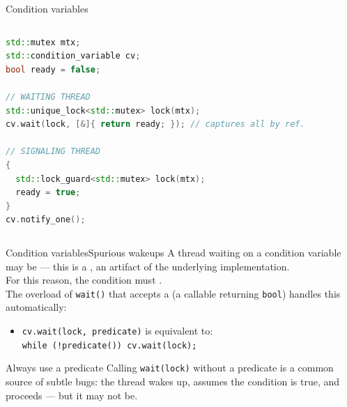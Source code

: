 \begin{frame}[fragile]{Condition variables}
	\begin{columns}
		\begin{lstlisting}[style=codebeamer, language=C++, caption=Basic condition variable pattern.]
std::mutex mtx;
std::condition_variable cv;
bool ready = false;

// WAITING THREAD
std::unique_lock<std::mutex> lock(mtx);
cv.wait(lock, [&]{ return ready; }); // captures all by ref.

// SIGNALING THREAD
{
  std::lock_guard<std::mutex> lock(mtx);
  ready = true;
}
cv.notify_one();
    \end{lstlisting}
	\end{columns}
\end{frame}
\begin{frame}{Condition variables}{Spurious wakeups}
	\justifying
	A thread waiting on a condition variable may be  — this is a , an artifact of the underlying implementation.\\
	\bigskip
	For this reason, the condition must .\\
	The overload of \texttt{wait()} that accepts a  (a callable returning \texttt{bool}) handles this automatically:
	\begin{itemize}
		\item \texttt{cv.wait(lock, predicate)} is equivalent to:\\
			\texttt{while (!predicate()) cv.wait(lock);}
	\end{itemize}
	\bigskip
	\begin{alertblock}{Always use a predicate}
		\justifying
		Calling \texttt{wait(lock)} without a predicate is a common source of subtle bugs: the thread wakes up, assumes the condition is true, and proceeds — but it may not be.
	\end{alertblock}
\end{frame}
